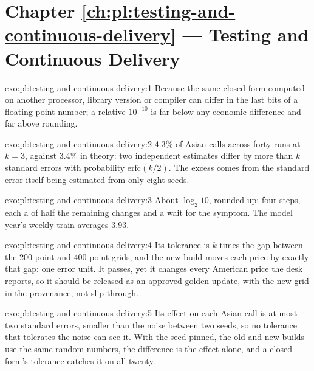 \section*{Chapter \ref{ch:pl:testing-and-continuous-delivery} --- Testing and Continuous Delivery}

\begin{solution}{exo:pl:testing-and-continuous-delivery:1}
Because the same closed form computed on another processor, library version or compiler can differ in the last bits of a floating-point
number; a relative $10^{-10}$ is far below any economic difference and far above rounding.
\end{solution}

\begin{solution}{exo:pl:testing-and-continuous-delivery:2}
4.3\% of Asian calls across forty runs at $k=3$, against 3.4\% in theory: two independent estimates differ by more than $k$ standard errors with
probability $\mathrm{erfc}(k/2)$. The excess comes from the standard error itself being estimated from only eight seeds.
\end{solution}

\begin{solution}{exo:pl:testing-and-continuous-delivery:3}
About $\log_2 10$, rounded up: four steps, each a  of half the remaining changes and a wait for the symptom. The model year's weekly
train averages 3.93.
\end{solution}

\begin{solution}{exo:pl:testing-and-continuous-delivery:4}
Its tolerance is $k$ times the gap between the 200-point and 400-point grids, and the new build moves each price by exactly that gap: one error
unit. It passes, yet it changes every American price the desk reports, so it should be released as an approved golden update, with the new grid
in the provenance, not slip through.
\end{solution}

\begin{solution}{exo:pl:testing-and-continuous-delivery:5}
Its effect on each Asian call is at most two standard errors, smaller than the noise between two seeds, so no tolerance that tolerates the
noise can see it. With the seed pinned, the old and new builds use the same random numbers, the difference is the effect alone, and a closed
form's tolerance catches it on all twenty.
\end{solution}

